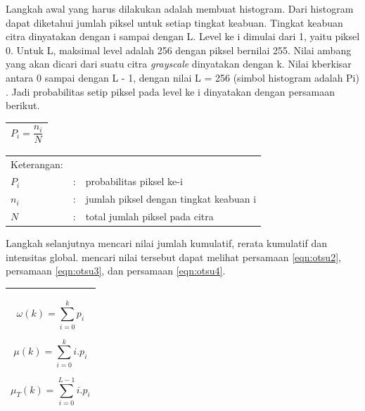 Langkah  awal  yang harus  dilakukan  adalah  membuat  histogram.  Dari histogram dapat diketahui jumlah piksel untuk setiap tingkat  keabuan.  Tingkat  keabuan  citra  dinyatakan dengan i sampai dengan L. Level ke i dimulai dari 1, yaitu  piksel  0.  Untuk L,  maksimal  level  adalah  256 dengan piksel bernilai 255. Nilai  ambang  yang  akan  dicari  dari  suatu  citra \textit{grayscale} dinyatakan dengan k. Nilai kberkisar antara 0  sampai  dengan L - 1,  dengan  nilai L = 256  (simbol histogram adalah Pi) \cite{otsu}. Jadi probabilitas setip piksel pada level ke i dinyatakan dengan persamaan berikut. 

\begin{table}[H]
	\small
	\begin{adjustbox}{width=1\textwidth}
		\begin{tabular}{|p{13.55cm}|}
			\hline
			\begin{equation} \label{eqn:otsu1}
			\displaystyle
			P_{i} = \frac{n_{i}}{N}
			\end{equation} \\
			\hline
		\end{tabular}
	\end{adjustbox}
\end{table}

\noindent
\renewcommand{\arraystretch}{1}
\begin{tabularx}{\textwidth}{lll}
	\hline
	Keterangan: \\
	$P_{i}$ & : & probabilitas piksel ke-i\\
	$n_{i}$ & : & jumlah piksel dengan tingkat keabuan i\\
	$N$ & : & total jumlah piksel pada citra\\
	\hline
\end{tabularx}
\vspace{4.5pt}

Langkah   selanjutnya   mencari   nilai   jumlah kumulatif, rerata  kumulatif  dan  intensitas  global. mencari  nilai  tersebut  dapat  melihat  persamaan  \eqref{eqn:otsu2}, persamaan \eqref{eqn:otsu3}, dan persamaan \eqref{eqn:otsu4}.

\begin{table}[H]
	\small
	\begin{adjustbox}{width=1\textwidth}
		\begin{tabular}{|p{13.55cm}|}
			\hline
			\begin{equation} \label{eqn:otsu2}
			\displaystyle
			\omega (k) = \sum\limits_{i=0}^{k} p_{i}
			\end{equation} 
			
			\begin{equation} \label{eqn:otsu3}
			\displaystyle
			\mu (k) = \sum\limits_{i=0}^{k} i . p_{i}
			\end{equation}
			 
			\begin{equation} \label{eqn:otsu4}
			\displaystyle
			\mu _{T} (k) = \sum\limits_{i=0}^{L-1} i . p_{i}
			\end{equation}\\
			\hline
		\end{tabular}
	\end{adjustbox}
\end{table}

